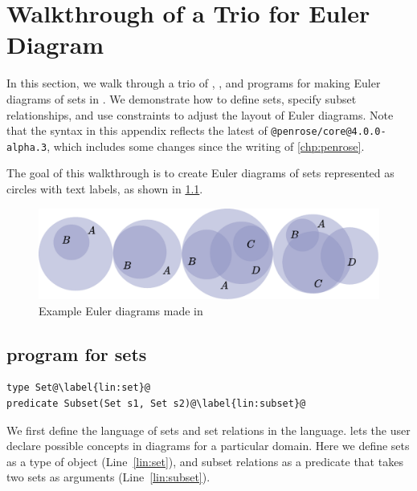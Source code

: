 \chapter{Walkthrough of a \Penrose Trio for Euler Diagram}
\label{app:penrose-trio-walkthrough}

In this section, we walk through a trio of \Substance, \Style, and \Domain programs for making Euler diagrams of sets in \Penrose. We demonstrate how to define sets, specify subset relationships, and use constraints to adjust the layout of Euler diagrams. Note that the syntax in this appendix reflects the latest of \texttt{@penrose/core@4.0.0-alpha.3}, which includes some changes since the writing of \cref{chp:penrose}.

The goal of this walkthrough is to create Euler diagrams of sets represented as circles with text labels, as shown in \cref{fig:sets-euler}.

\begin{figure}[h!]
    \centering
    \includegraphics[width=.9\linewidth]{assets/appendix/sets-euler.pdf}
    \caption{Example Euler diagrams made in \Penrose}
    \label{fig:sets-euler}
\end{figure}

\section{\Domain program for sets}

\begin{center}
\begin{mdframed}[style=DSLCode]
\begin{lstlisting}[language=Elem,escapechar=@]
type Set@\label{lin:set}@
predicate Subset(Set s1, Set s2)@\label{lin:subset}@
\end{lstlisting}
\end{mdframed}
\end{center}

We first define the language of sets and set relations in the \Domain language. \Domain lets the user declare possible concepts in diagrams for a particular domain. Here we define sets as a type of object (Line~\ref{lin:set}), and subset relations as a predicate that takes two sets as arguments (Line~\ref{lin:subset}).

